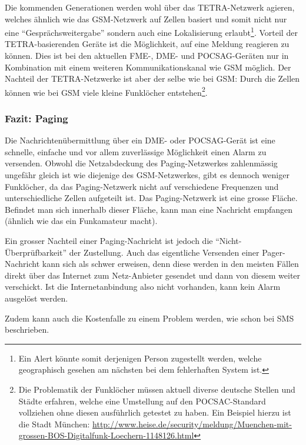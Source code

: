 Die kommenden Generationen werden wohl \"uber das TETRA-Netzwerk agieren, welches \"ahnlich wie das GSM-Netzwerk auf Zellen basiert und somit nicht nur eine "`Gespr\"achsweitergabe"' sondern auch eine Lokalisierung erlaubt\footnote{Ein Alert k\"onnte somit derjenigen Person zugestellt werden, welche geographisch gesehen am n\"achsten bei dem fehlerhaften System ist.}. Vorteil der TETRA-basierenden Ger\"ate ist die M\"oglichkeit, auf eine Meldung reagieren zu k\"onnen. Dies ist bei den aktuellen FME-, DME- und POCSAG-Ger\"aten nur in Kombination mit einem weiteren Kommunikationskanal wie GSM m\"oglich. Der Nachteil der TETRA-Netzwerke ist aber der selbe wie bei GSM: Durch die Zellen k\"onnen wie bei GSM viele kleine Funkl\"ocher entstehen\footnote{Die Problematik der Funkl\"ocher m\"ussen aktuell diverse deutsche Stellen und St\"adte erfahren, welche eine Umstellung auf den POCSAC-Standard vollziehen ohne diesen ausf\"uhrlich getestet zu haben. Ein Beispiel hierzu ist die Stadt M\"unchen: \url{http://www.heise.de/security/meldung/Muenchen-mit-grossen-BOS-Digitalfunk-Loechern-1148126.html}}.

\subsubsection{Fazit: Paging} \label{sec:theorie-alert-paging-fazit}
Die Nachrichten\"ubermittlung \"uber ein DME- oder POCSAG-Ger\"at ist eine schnelle, einfache und vor allem zuverl\"assige M\"oglichkeit einen Alarm zu versenden. Obwohl die Netzabdeckung des Paging-Netzwerkes zahlenm\"assig ungef\"ahr gleich ist wie diejenige des GSM-Netzwerkes, gibt es dennoch weniger Funkl\"ocher, da das Paging-Netzwerk nicht auf verschiedene Frequenzen und unterschiedliche Zellen aufgeteilt ist. Das Paging-Netzwerk ist eine grosse Fl\"ache. Befindet man sich innerhalb dieser Fl\"ache, kann man eine Nachricht empfangen (\"ahnlich wie das ein Funkamateur macht).

Ein grosser Nachteil einer Paging-Nachricht ist jedoch die "`Nicht-\"Uberpr\"ufbarkeit"' der Zustellung. Auch das eigentliche Versenden einer Pager-Nachricht kann sich als schwer erweisen, denn diese werden in den meisten F\"allen direkt \"uber das Internet zum Netz-Anbieter gesendet und dann von diesem weiter verschickt. Ist die Internetanbindung also nicht vorhanden, kann kein Alarm ausgel\"ost werden.

Zudem kann auch die Kostenfalle zu einem Problem werden, wie schon bei SMS beschrieben.



